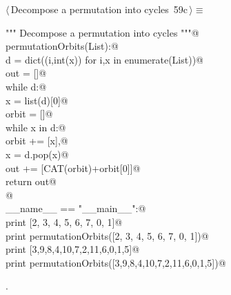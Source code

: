 \documentclass[11pt,oneside]{article}    %
\begin{document}
\begin{flushleft} \small \label{scrap116}
\protect{}$\langle\,$Decompose a permutation into cycles\nobreak\ {\footnotesize 59c}$\,\rangle\equiv$
\vspace{-1ex}
\begin{list}{}{} \item
\mbox{}\verb@""" Decompose a permutation into cycles """@\\
\mbox{}\verb@def permutationOrbits(List):@\\
\mbox{}\verb@    d = dict((i,int(x)) for i,x in enumerate(List))@\\
\mbox{}\verb@    out = []@\\
\mbox{}\verb@    while d:@\\
\mbox{}\verb@        x = list(d)[0]@\\
\mbox{}\verb@        orbit = []@\\
\mbox{}\verb@        while x in d:@\\
\mbox{}\verb@            orbit += [x],@\\
\mbox{}\verb@            x = d.pop(x)@\\
\mbox{}\verb@        out += [CAT(orbit)+orbit[0]]@\\
\mbox{}\verb@    return out@\\
\mbox{}\verb@        @\\
\mbox{}\verb@if __name__ == "__main__":@\\
\mbox{}\verb@    print [2, 3, 4, 5, 6, 7, 0, 1]@\\
\mbox{}\verb@    print permutationOrbits([2, 3, 4, 5, 6, 7, 0, 1])@\\
\mbox{}\verb@    print [3,9,8,4,10,7,2,11,6,0,1,5]@\\
\mbox{}\verb@    print permutationOrbits([3,9,8,4,10,7,2,11,6,0,1,5])@\\
\mbox{}\verb@@{\NWsep}
\end{list}
\vspace{-1ex}
\footnotesize\addtolength{\baselineskip}{-1ex}
\begin{list}{}{\setlength{\itemsep}{-\parsep}\setlength{\itemindent}{-\leftmargin}}
\item {\NWtxtMacroNoRef}.
\end{list}
\end{flushleft}
\end{document}
